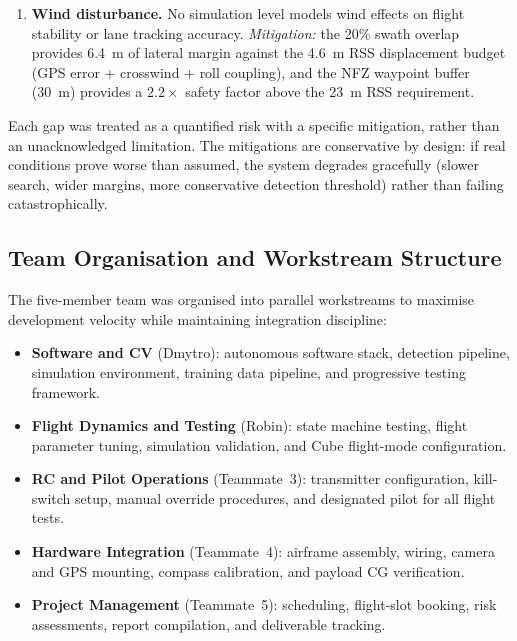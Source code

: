\begin{enumerate}
  \item \textbf{Wind disturbance.}
    No simulation level models wind effects on flight stability or lane tracking accuracy.
    \emph{Mitigation:} the 20\% swath overlap provides \SI{6.4}{\metre} of lateral margin against the \SI{4.6}{\metre} RSS displacement budget (GPS error + crosswind + roll coupling), and the NFZ waypoint buffer (\SI{30}{\metre}) provides a $2.2\times$ safety factor above the \SI{23}{\metre} RSS requirement.
\end{enumerate}

Each gap was treated as a quantified risk with a specific mitigation, rather than an unacknowledged limitation.
The mitigations are conservative by design: if real conditions prove worse than assumed, the system degrades gracefully (slower search, wider margins, more conservative detection threshold) rather than failing catastrophically.

\subsection{Team Organisation and Workstream Structure}\label{sec:team-strategy}

The five-member team was organised into parallel workstreams to maximise development velocity while maintaining integration discipline:

\begin{itemize}[nosep]
  \item \textbf{Software and CV} (Dmytro): autonomous software stack, detection pipeline, simulation environment, training data pipeline, and progressive testing framework.
  \item \textbf{Flight Dynamics and Testing} (Robin): state machine testing, flight parameter tuning, simulation validation, and Cube flight-mode configuration.
  \item \textbf{RC and Pilot Operations} (Teammate~3): transmitter configuration, kill-switch setup, manual override procedures, and designated pilot for all flight tests.
  \item \textbf{Hardware Integration} (Teammate~4): airframe assembly, wiring, camera and GPS mounting, compass calibration, and payload CG verification.
  \item \textbf{Project Management} (Teammate~5): scheduling, flight-slot booking, risk assessments, report compilation, and deliverable tracking.
\end{itemize}

